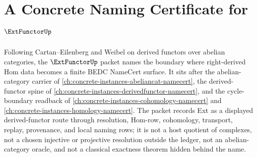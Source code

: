 \chapter{A Concrete Naming Certificate for $\ExtFunctorUp$}
\label{ch:concrete-instances-ext-functor-namecert}

Following Cartan--Eilenberg and Weibel on derived functors over abelian categories, the $\ExtFunctorUp$ packet names the boundary where right-derived Hom data becomes a finite BEDC NameCert surface. It sits after the abelian-category carrier of \autoref{ch:concrete-instances-abeliancat-namecert}, the derived-functor spine of \autoref{ch:concrete-instances-derivedfunctor-namecert}, and the cycle-boundary readback of \autoref{ch:concrete-instances-cohomology-namecert} and \autoref{ch:concrete-instances-homology-namecert}. The packet records Ext as a displayed derived-functor route through resolution, Hom-row, cohomology, transport, replay, provenance, and local naming rows; it is not a host quotient of complexes, not a chosen injective or projective resolution outside the ledger, not an abelian-category oracle, and not a classical exactness theorem hidden behind the name.

